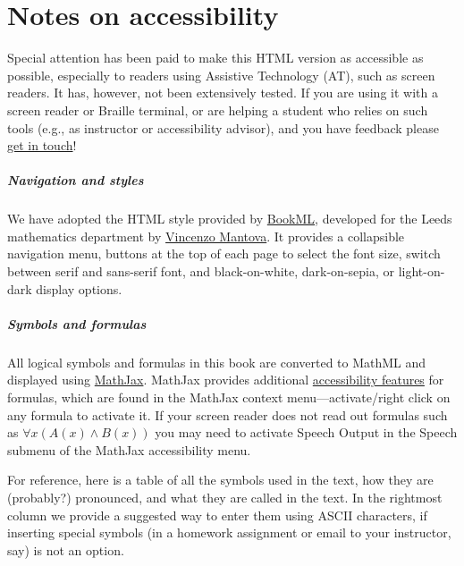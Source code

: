 
\chapter{Notes on accessibility}

Special attention has been paid to make this HTML version as
accessible as possible, especially to readers using Assistive
Technology (AT), such as screen readers. It has, however, not
been extensively tested. If you are using it with a screen reader or
Braille terminal, or are helping a student who relies on such tools
(e.g., as instructor or accessibility advisor), and you have feedback
please \href{mailto:rzach@ucalgary.ca}{get in touch}!

\paragraph{Navigation and styles} We have adopted the HTML style
provided by \href{https://vlmantova.github.io/bookml/}{BookML},
developed for the Leeds mathematics department by
\href{https://eps.leeds.ac.uk/maths/staff/4058/dr-vincenzo-l-mantova}{Vincenzo
Mantova}. It provides a collapsible navigation menu, buttons at the
top of each page to select the font size, switch between serif and
sans-serif font, and black-on-white, dark-on-sepia, or light-on-dark
display options.

\paragraph{Symbols and formulas} All logical symbols and formulas in
this book are converted to MathML and displayed using
\href{https://www.mathjax.org/}{MathJax}. MathJax provides additional
\href{https://docs.mathjax.org/en/latest/basic/accessibility.html}{accessibility
features} for formulas, which are found in the MathJax context
menu---activate/right click on any formula to activate it. If your
screen reader does not read out formulas such as $\forall x(A(x) \land
B(x))$ you may need to activate Speech Output in the Speech submenu of
the MathJax accessibility menu.

For reference, here is a table of all the symbols used in the text,
how they are (probably?) pronounced, and what they are called in the
text. In the rightmost column we provide a suggested way to enter them
using ASCII characters, if inserting special symbols (in a homework
assignment or email to your instructor, say) is not an option.

